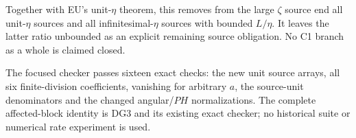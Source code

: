 Together with EU's unit-$\eta$ theorem, this removes from the large
$\zeta$ source end all unit-$\eta$ sources and all infinitesimal-$\eta$
sources with bounded $L/\eta$. It leaves the latter ratio unbounded
as an explicit remaining source obligation. No C1 branch as a whole
is claimed closed.

The focused checker
 passes sixteen
exact checks: the new unit source arrays, all six finite-division
coefficients, vanishing for arbitrary $a$, the source-unit
denominators and the changed angular/$PH$ normalizations. The
complete affected-block identity is DG3 and its existing exact
checker; no historical suite or numerical rate experiment is used.

